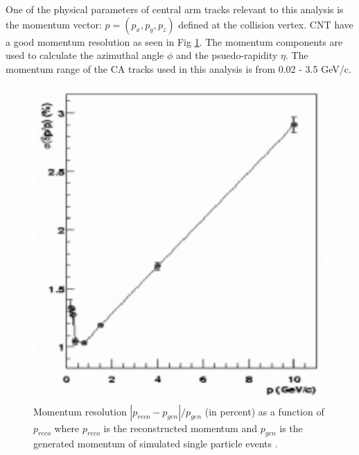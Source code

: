 One of the physical parameters of central arm tracks relevant to this analysis is the momentum vector: $p = (p_x, p_y, p_z)$ defined at the collision vertex. CNT have a good momentum resolution as seen in Fig \ref{fig:dc_mom_res}. The momentum components are used to calculate the azimuthal angle $\phi$ and the psuedo-rapidity $\eta$. The momentum range of the CA tracks used in this analysis is from 0.02 - 3.5 GeV/c.
\begin{figure}[!h]
\begin{center}
\includegraphics[width=0.45\linewidth]{figs/dc_mom_res.png}
\caption{Momentum resolution $|p_{reco}-p_{gen}|/p_{gen}$ (in percent) as a function of $p_{reco}$ where $p_{reco}$ is the reconstructed momentum and $p_{gen}$ is the generated momentum of simulated single particle events \cite{CA_spectro}.}
\label{fig:dc_mom_res}
\end{center}
\end{figure}

